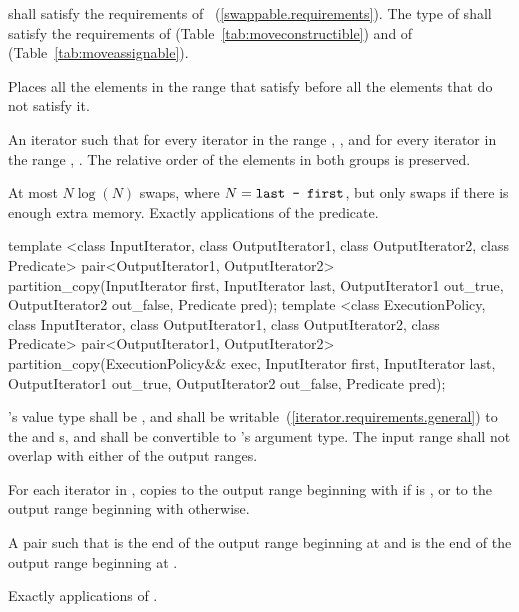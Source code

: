 \begin{itemdescr}
\pnum
\requires
{} shall satisfy the requirements of
~(\ref{swappable.requirements}). The type
of  shall satisfy the requirements of
 (Table~\ref{tab:moveconstructible}) and of
 (Table~\ref{tab:moveassignable}).

\pnum
\effects
Places all the elements in the range
that satisfy  before all the
elements that do not satisfy it.

\pnum
\returns
An iterator
such that for every iterator
in the range
,
,
and for every iterator
in the range
,
.
The relative order of the elements in both groups is preserved.

\pnum
\complexity
At most $N \log(N)$ swaps, where $N = \texttt{last - first}$,
but only  swaps if there is enough extra memory.
Exactly
applications of the predicate.
\end{itemdescr}

%
\begin{itemdecl}
template <class InputIterator, class OutputIterator1,
          class OutputIterator2, class Predicate>
  pair<OutputIterator1, OutputIterator2>
    partition_copy(InputIterator first, InputIterator last,
                   OutputIterator1 out_true, OutputIterator2 out_false,
                   Predicate pred);
template <class ExecutionPolicy, class InputIterator, class OutputIterator1,
          class OutputIterator2, class Predicate>
  pair<OutputIterator1, OutputIterator2>
    partition_copy(ExecutionPolicy&& exec,
                   InputIterator first, InputIterator last,
                   OutputIterator1 out_true, OutputIterator2 out_false,
                   Predicate pred);
\end{itemdecl}


\begin{itemdescr}
\pnum
\requires {}'s value type shall be , and shall be
writable~(\ref{iterator.requirements.general}) to the  and  s, and shall be
convertible to 's argument type. The input range shall not overlap with
either of the output ranges.

\pnum
\effects For each iterator  in , copies  to the output range beginning with  if  is , or to the output range beginning with  otherwise.

\pnum
\returns A pair  such that  is the end of the output range beginning at  and  is the end of the output range beginning at .

\pnum
\complexity Exactly  applications of .
\end{itemdescr}

